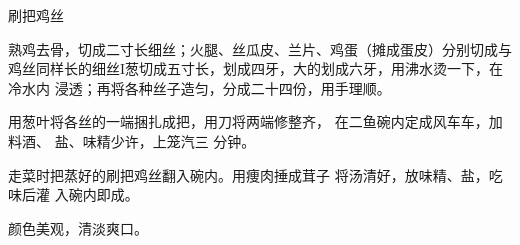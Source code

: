 \begin{recipe}{刷把鸡丝}

\ingredients




\preparation

\step 熟鸡去骨，切成二寸长细丝；火腿、丝瓜皮、兰片、鸡蛋（摊成蛋皮）分别切成与
鸡丝同样长的细丝I葱切成五寸长，划成四牙，大的划成六牙，用沸水烫一下，在冷水内
浸透；再将各种丝子造匀，分成二十四份，用手理顺。

用葱叶将各丝的一端捆扎成把，用刀将两端修整齐， 在二鱼碗内定成风车车，加料酒、
盐、味精少许，上笼汽三 分钟。

走菜时把蒸好的刷把鸡丝翻入碗内。用痩肉捶成茸子 将汤清好，放味精、盐，吃味后灌
入碗内即成。

\features

颜色美观，清淡爽口。

\end{recipe}

